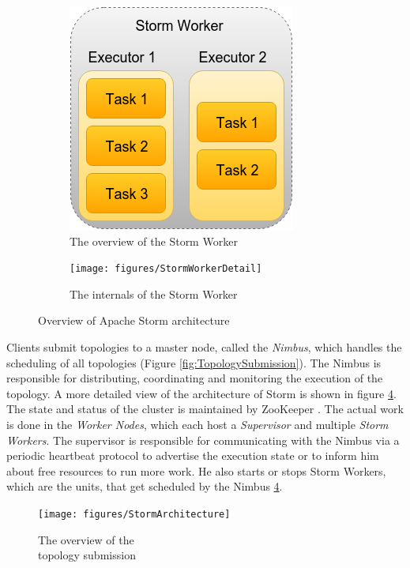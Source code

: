 \documentclass[conference]{IEEEtran}
\begin{document}
\begin{figure}[!h]
\centering
	\begin{subfigure}{.55\columnwidth}
		\includegraphics[scale=0.35]{figures/StormWorker}
		    \caption{The overview of the Storm Worker}
		    \label{fig:StormWorkerOverview}
	\end{subfigure}\hspace{2.9em}
	\begin{subfigure}{1.35\columnwidth}
		\texttt{[image: figures/StormWorkerDetail]}
		    \caption{The internals of the Storm Worker}
		    \label{fig:StormWorkerDetail}
	\end{subfigure}\hfill
\label{fig:StormArchitectureOverview}
\caption{Overview of Apache Storm architecture}
\end{figure}

Clients submit topologies to a master node, called the \emph{Nimbus}, which handles the scheduling of all topologies (Figure \ref{fig:TopologySubmission}).
The Nimbus is responsible for distributing, coordinating and monitoring the execution of the topology.
A more detailed view of the architecture of Storm is shown in figure \ref{fig:StormArchitecture}.
The state and status of the cluster is maintained by ZooKeeper \cite{Zookeeper}.
The actual work is done in the \emph{Worker Nodes}, which each host a \emph{Supervisor} and multiple \emph{Storm Workers}.
The supervisor is responsible for communicating with the Nimbus via a periodic heartbeat protocol to advertise the execution state or to inform him about free resources to run more work.
He also starts or stops Storm Workers, which are the units, that get scheduled by the Nimbus \ref{fig:StormArchitecture}.

\begin{figure}[!hb]
		\texttt{[image: figures/StormArchitecture]}
		\caption{The overview of the \\topology submission}
		\label{fig:StormArchitecture}
\end{figure}
\end{document}
